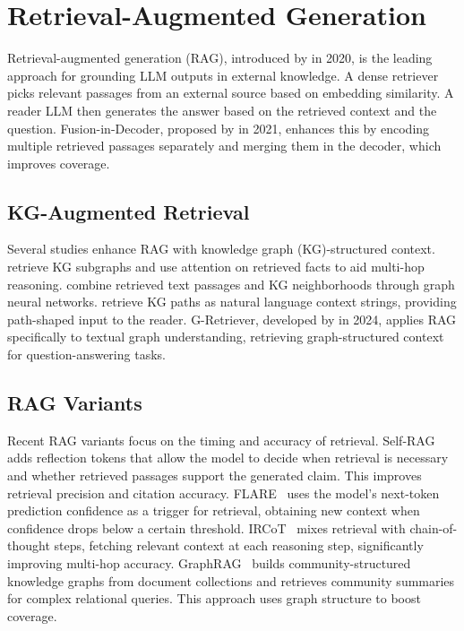 \section{Retrieval-Augmented Generation}
\label{sec:rag}

Retrieval-augmented generation (RAG), introduced by \citet{lewis2020rag} in 2020, is the leading approach for grounding LLM outputs in external knowledge. A dense retriever picks relevant passages from an external source based on embedding similarity. A reader LLM then generates the answer based on the retrieved context and the question. Fusion-in-Decoder, proposed by \citet{izacard2021leveraging} in 2021, enhances this by encoding multiple retrieved passages separately and merging them in the decoder, which improves coverage.

\subsection{KG-Augmented Retrieval}

Several studies enhance RAG with knowledge graph (KG)-structured context. \citet{he2021multihop} retrieve KG subgraphs and use attention on retrieved facts to aid multi-hop reasoning. \citet{yasunaga2021qagnn} combine retrieved text passages and KG neighborhoods through graph neural networks. \citet{shi2021kgpath} retrieve KG paths as natural language context strings, providing path-shaped input to the reader. G-Retriever, developed by \citet{he2024gretriever} in 2024, applies RAG specifically to textual graph understanding, retrieving graph-structured context for question-answering tasks.

\subsection{RAG Variants}

Recent RAG variants focus on the timing and accuracy of retrieval. Self-RAG~\citep{asai2024selfrag} adds reflection tokens that allow the model to decide when retrieval is necessary and whether retrieved passages support the generated claim. This improves retrieval precision and citation accuracy. FLARE~\citep{jiang2023flare} uses the model's next-token prediction confidence as a trigger for retrieval, obtaining new context when confidence drops below a certain threshold. IRCoT~\citep{trivedi2022ircot} mixes retrieval with chain-of-thought steps, fetching relevant context at each reasoning step, significantly improving multi-hop accuracy. GraphRAG~\citep{edge2024graphrag} builds community-structured knowledge graphs from document collections and retrieves community summaries for complex relational queries. This approach uses graph structure to boost coverage.

